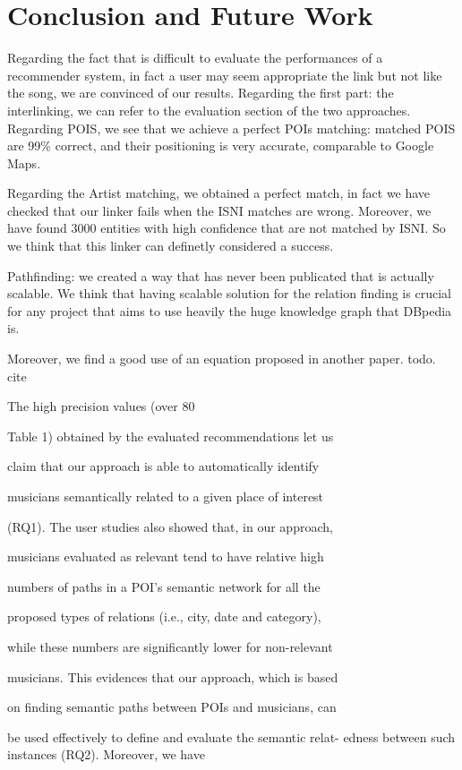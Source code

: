 \section{Conclusion and Future Work}
Regarding the fact that is difficult to evaluate the performances of a recommender system, in fact a user may seem appropriate the link but not like the song, we are convinced of our results.
Regarding the first part: the interlinking, we can refer to the evaluation section of the two approaches. Regarding POIS, we see that we achieve a perfect POIs matching: matched POIS are 99\% correct, and their positioning is very accurate, comparable to Google Maps.

Regarding the Artist matching, we obtained a perfect match, in fact we have checked that our linker fails when the ISNI matches are wrong. Moreover, we have found 3000 entities with high confidence that are not matched by ISNI. So we think that this linker can definetly considered a success.

Pathfinding: we created a way that has never been publicated that is actually scalable. We think that having scalable solution for the relation finding is crucial for any project that aims to use heavily the huge knowledge graph that DBpedia is.

Moreover, we find a good use of an equation proposed in another paper. todo. cite




The high precision values (over 80%

Table 1) obtained by the evaluated recommendations let us

claim that our approach is able to automatically identify

musicians semantically related to a given place of interest

(RQ1). The user studies also showed that, in our approach,

musicians evaluated as relevant tend to have relative high

numbers of paths in a POI’s semantic network for all the

proposed types of relations (i.e., city, date and category),

while these numbers are significantly lower for non-relevant

musicians. This evidences that our approach, which is based

on finding semantic paths between POIs and musicians, can

be used effectively to define and evaluate the semantic relat-
edness between such instances (RQ2). Moreover, we have

